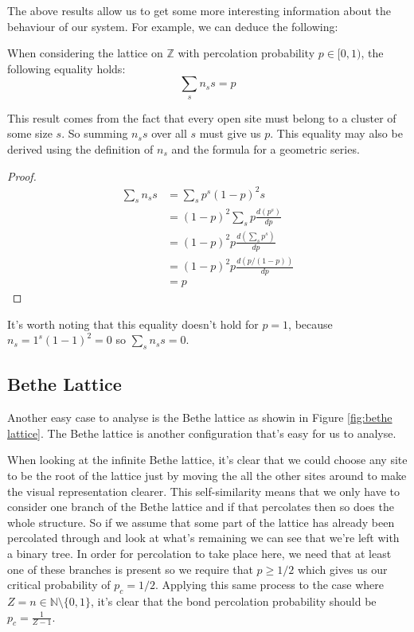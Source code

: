 The above results allow us to get some more interesting information about the behaviour of our system. For example, we can deduce the following:
\begin{corollary}
  When considering the lattice on $\mathbb{Z}$ with percolation probability $p \in [0, 1)$, the following equality holds:
  $$\sum_sn_ss = p$$
\end{corollary}
This result comes from the fact that every open site must belong to a cluster of some size $s$. So summing $n_ss$ over all $s$ must give us $p$. This equality may also be derived
using the definition of $n_s$ and the formula for a geometric series.

\begin{proof}
  \begin{align*}
    \sum_sn_ss &= \sum_sp^s(1-p)^2s \\
    &= (1-p)^2\sum_sp\frac{d(p^s)}{dp} \\
    &= (1-p)^2p\frac{d(\sum_sp^s)}{dp} \\
    &= (1-p)^2p\frac{d(p/(1-p))}{dp} \\
    &= p
  \end{align*}
\end{proof}

It's worth noting that this equality doesn't hold for $p=1$, because $n_s=1^s(1-1)^2=0$ so $\sum_sn_ss = 0$.

\subsection{Bethe Lattice}
Another easy case to analyse is the Bethe lattice as showin in Figure \ref{fig:bethe lattice}. The Bethe lattice is another configuration that's easy for us to analyse.

When looking at the infinite Bethe lattice, it's clear that we could choose any site to be the root of the lattice just by moving the all the other sites around to make the visual
representation clearer. This self-similarity means that we only have to consider one branch of the Bethe lattice and if that percolates then so does the whole structure. So if we
assume that some part of the lattice has already been percolated through and look at what's remaining we can see that we're left with a binary tree. In order for percolation to
take place here, we need that at least one of these branches is present so we require that $p \geq 1/2$ which gives us our critical probability of $p_c = 1/2$. Applying this same
process to the case where $Z = n \in \mathbb{N}\setminus \{0, 1\}$, it's clear that the bond percolation probability should be $p_c = \frac{1}{Z-1}$.

